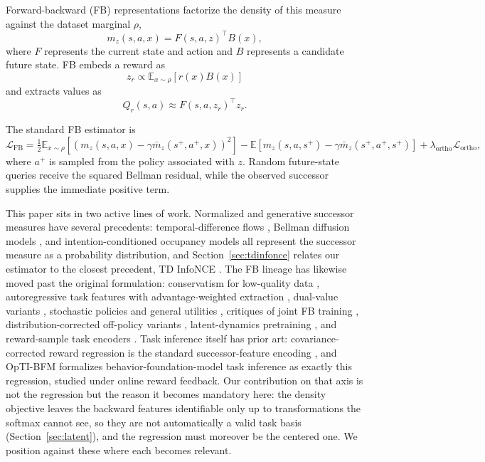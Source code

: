 \documentclass{article}
\newcommand{\E}{\mathbb{E}}
\begin{document}
Forward-backward (FB) representations
\citep{touati2021learning,touati2023does}
factorize the density of this measure against the dataset marginal $\rho$,
\begin{equation}
m_z(s,a,x) = F(s,a,z)^\top B(x),
\end{equation}
where $F$ represents the current state and action and $B$ represents a candidate future state.
FB embeds a reward as
\begin{equation}
z_r \propto \E_{x\sim\rho}[r(x)B(x)]
\end{equation}
and extracts values as
\begin{equation}
Q_r(s,a) \approx F(s,a,z_r)^\top z_r.
\end{equation}

The standard FB estimator is
\begin{equation}
\label{eq:fb-loss}
\mathcal L_{\mathrm{FB}} = \tfrac12 \E_{x\sim\rho} \left[ \left( m_z(s,a,x) - \gamma\bar m_z(s^+,a^+,x) \right)^2 \right]
                            - \E\left[ m_z(s,a,s^+) - \gamma\bar m_z(s^+,a^+,s^+) \right]
                            + \lambda_{\mathrm{ortho}} \mathcal L_{\mathrm{ortho}},
\end{equation}
where $a^+$ is sampled from the policy associated with $z$.
Random future-state queries receive the squared Bellman residual, while the observed successor supplies the immediate positive term.

This paper sits in two active lines of work.
Normalized and generative successor measures have several precedents: temporal-difference flows \citep{farebrother2025tdflows}, Bellman diffusion models \citep{shribak2024bellmandiffusion}, and intention-conditioned occupancy models \citep{zheng2026infom} all represent the successor measure as a probability distribution, and Section~\ref{sec:tdinfonce} relates our estimator to the closest precedent, TD InfoNCE \citep{zheng2024tdinfonce}.
The FB lineage has likewise moved past the original formulation: conservatism for low-quality data \citep{jeen2024lowquality}, autoregressive task features with advantage-weighted extraction \citep{cetin2024finer}, dual-value variants \citep{sun2025dvfb}, stochastic policies and general utilities \citep{bagatella2026softfb}, critiques of joint FB training \citep{zheng2026onestepfb}, distribution-corrected off-policy variants \citep{asadulaev2026zol}, latent-dynamics pretraining \citep{bagatella-iclr26a}, and reward-sample task encoders \citep{frans2024fre}.
Task inference itself has prior art: covariance-corrected reward regression is the standard successor-feature encoding \citep{cetin2024finer}, and OpTI-BFM \citep{rupf2026optibfm} formalizes behavior-foundation-model task inference as exactly this regression, studied under online reward feedback.
Our contribution on that axis is not the regression but the reason it becomes mandatory here: the density objective leaves the backward features identifiable only up to transformations the softmax cannot see, so they are not automatically a valid task basis (Section~\ref{sec:latent}), and the regression must moreover be the centered one.
We position against these where each becomes relevant.
\end{document}
